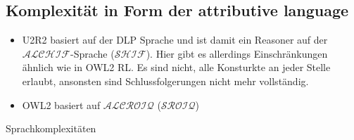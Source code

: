 \subsection{Komplexität in Form der attributive language}
\begin{itemize}
  \item U2R2 basiert auf der DLP Sprache und ist damit ein Reasoner auf der $\mathcal{ALCHIF}$-Sprache ($\mathcal{SHIF}$). Hier gibt es allerdings Einschränkungen ähnlich wie in OWL2 RL. Es sind nicht, alle Konsturkte an jeder Stelle erlaubt, ansonsten sind Schlussfolgerungen nicht mehr vollständig.
  \item OWL2 basiert auf $\mathcal{ALCROIQ}$ ($\mathcal{SROIQ}$) \cite{Krötzsch2008}
\end{itemize}


\begin{table}
	\caption{Sprachkomplexitäten}
	\label{table-sprachkomplexitaeten}
	

\end{table}
